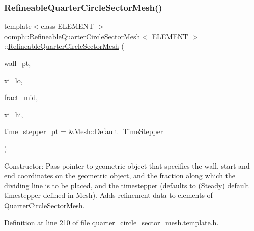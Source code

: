 \subsubsection{\texorpdfstring{Refineable\+Quarter\+Circle\+Sector\+Mesh()}{RefineableQuarterCircleSectorMesh()}}
{\footnotesize\ttfamily template$<$class E\+L\+E\+M\+E\+NT $>$ \\
\hyperlink{classoomph_1_1RefineableQuarterCircleSectorMesh}{oomph\+::\+Refineable\+Quarter\+Circle\+Sector\+Mesh}$<$ E\+L\+E\+M\+E\+NT $>$\+::\hyperlink{classoomph_1_1RefineableQuarterCircleSectorMesh}{Refineable\+Quarter\+Circle\+Sector\+Mesh} (\begin{DoxyParamCaption}\item[{Geom\+Object $\ast$}]{wall\+\_\+pt,  }\item[{const double \&}]{xi\+\_\+lo,  }\item[{const double \&}]{fract\+\_\+mid,  }\item[{const double \&}]{xi\+\_\+hi,  }\item[{Time\+Stepper $\ast$}]{time\+\_\+stepper\+\_\+pt = {\ttfamily \&Mesh\+:\+:Default\+\_\+TimeStepper} }\end{DoxyParamCaption})\hspace{0.3cm}{\ttfamily [inline]}}



Constructor\+: Pass pointer to geometric object that specifies the wall, start and end coordinates on the geometric object, and the fraction along which the dividing line is to be placed, and the timestepper (defaults to (Steady) default timestepper defined in Mesh). Adds refinement data to elements of \hyperlink{classoomph_1_1QuarterCircleSectorMesh}{Quarter\+Circle\+Sector\+Mesh}. 



Definition at line 210 of file quarter\+\_\+circle\+\_\+sector\+\_\+mesh.\+template.\+h.

\mbox{\label{classoomph_1_1RefineableQuarterCircleSectorMesh_abf958060ab5ea27a2ca079cba58af8f5}} 
